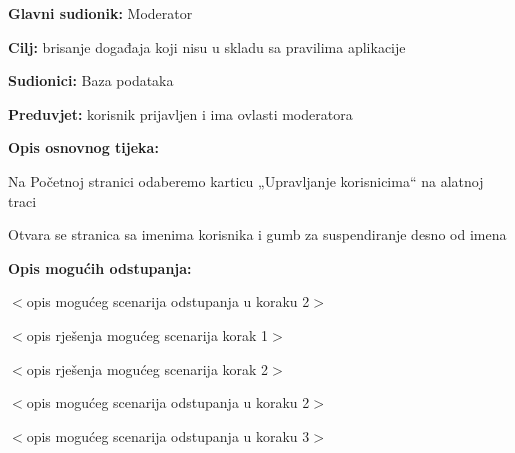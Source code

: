 	\noindent {}
\begin{packed_item}
	
	\item \textbf{Glavni sudionik: }Moderator
	\item  \textbf{Cilj:} brisanje događaja koji nisu u skladu sa pravilima aplikacije
	\item  \textbf{Sudionici:}
	Baza podataka
	\item  \textbf{Preduvjet:} korisnik prijavljen i ima ovlasti moderatora
	\item  \textbf{Opis osnovnog tijeka:}
	
	\item[] \begin{packed_enum}
		
		\item	Na Početnoj stranici odaberemo karticu „Upravljanje korisnicima“ na alatnoj traci
		\item	Otvara se stranica sa imenima korisnika i gumb za suspendiranje desno od imena
		
	\end{packed_enum}
	
	\item  \textbf{Opis mogućih odstupanja:}
	
	\item[] \begin{packed_item}
		
		\item[2.a] $<$opis mogućeg scenarija odstupanja u koraku 2$>$
		\item[] \begin{packed_enum}
			
			\item $<$opis rješenja mogućeg scenarija korak 1$>$
			\item $<$opis rješenja mogućeg scenarija korak 2$>$
			
		\end{packed_enum}
		\item[2.b] $<$opis mogućeg scenarija odstupanja u koraku 2$>$
		\item[3.a] $<$opis mogućeg scenarija odstupanja  u koraku 3$>$
		
	\end{packed_item}
\end{packed_item}

